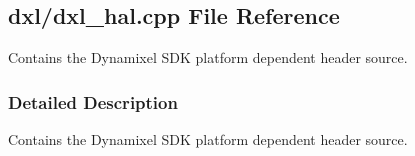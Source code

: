 \hypertarget{a00012}{}\subsection{dxl/dxl\+\_\+hal.cpp File Reference}
\label{a00012}


Contains the Dynamixel S\+D\+K platform dependent header source.  




\subsubsection{Detailed Description}
Contains the Dynamixel S\+D\+K platform dependent header source. 


